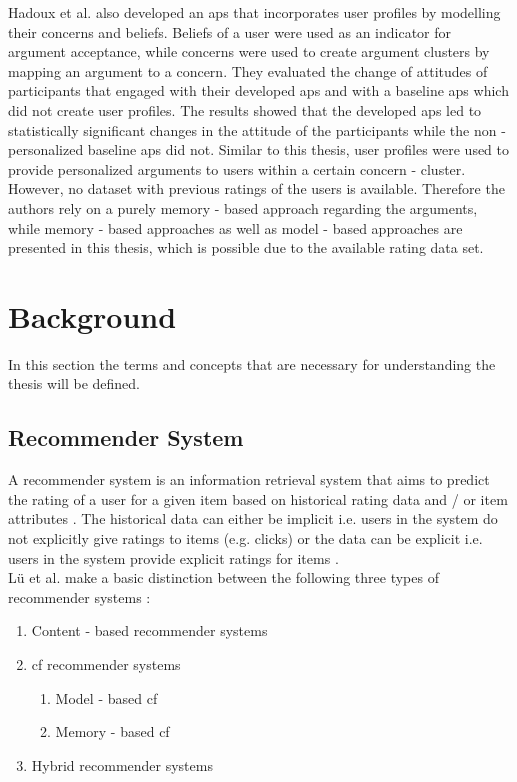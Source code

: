 Hadoux et al. \cite{hadoux2021strategic} also developed an \acrshort{aps} that incorporates user profiles by modelling their concerns and beliefs. Beliefs of a user were used as an indicator for argument acceptance, while concerns were used to create argument clusters by mapping an argument to a concern. They evaluated the change of attitudes of participants that engaged with their developed \acrshort{aps} and with a baseline \acrshort{aps} which did not create user profiles. The results showed that the developed \acrshort{aps} led to statistically significant changes in the attitude of the participants while the non - personalized baseline \acrshort{aps} did not. Similar to this thesis, user profiles were used to provide personalized arguments to users within a certain concern - cluster. However, no dataset with previous ratings of the users is available. Therefore the authors rely on a purely memory - based \cite{aggarwal2016recommender} approach regarding the arguments, while memory - based approaches as well as model - based \cite{aggarwal2016recommender} approaches are presented in this thesis, which is possible due to the available rating data set.

\section{Background}
\label{sec:background}
In this section the terms and concepts that are necessary for understanding the thesis will be defined. 

\subsection{Recommender System}
\label{subsec:rec_sys}
A recommender system is an information retrieval system that aims to predict the rating of a user for a given item based on historical rating data and / or item attributes \cite{aggarwal2016recommender}.
The historical data can either be implicit i.e. users in the system do not explicitly give ratings to items (e.g. clicks) or the data
can be explicit i.e. users in the system provide explicit ratings for items \cite{beel2016paper}.\\
Lü et al. \cite{lu2012recommender} make a basic distinction between the following three types of recommender systems :
\begin{enumerate}
    \item Content - based recommender systems 
    \item \acrfull{cf} recommender systems
    \begin{enumerate}
        \item Model - based \acrshort{cf}
        \item Memory - based \acrshort{cf}
    \end{enumerate}
    \item Hybrid recommender systems
\end{enumerate}

